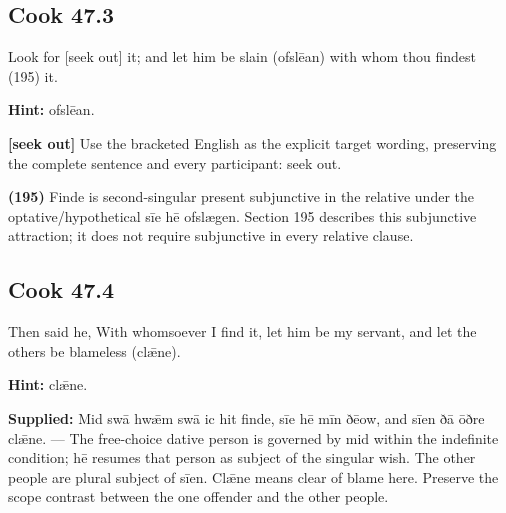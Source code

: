 \par\begin{minipage}{\linewidth}\raggedright
\subsection*{Cook 47.3}

Look for [seek out] it; and let him be slain (ofslēan) with whom thou findest (195) it.

\textbf{Hint:} ofslēan.

\textbf{[seek out]} Use the bracketed English as the explicit target wording, preserving the complete sentence and every participant: seek out.

\textbf{(195)} Finde is second-singular present subjunctive in the relative under the optative/\allowbreak{}hypothetical sīe hē ofslægen. Section 195 describes this subjunctive attraction; it does not require subjunctive in every relative clause.

\end{minipage}\par\addvspace{4pt}

\par\begin{minipage}{\linewidth}\raggedright
\subsection*{Cook 47.4}

Then said he, With whomsoever I find it, let him be my servant, and let the others be blameless (clǣne).

\textbf{Hint:} clǣne.

\end{minipage}\par\addvspace{4pt}

\textbf{Supplied:} Mid swā hwǣm swā ic hit finde, sīe hē mīn ðēow, and sīen ðā ōðre clǣne. — The free-choice dative person is governed by mid within the indefinite condition; hē resumes that person as subject of the singular wish. The other people are plural subject of sīen. Clǣne means clear of blame here. Preserve the scope contrast between the one offender and the other people.

